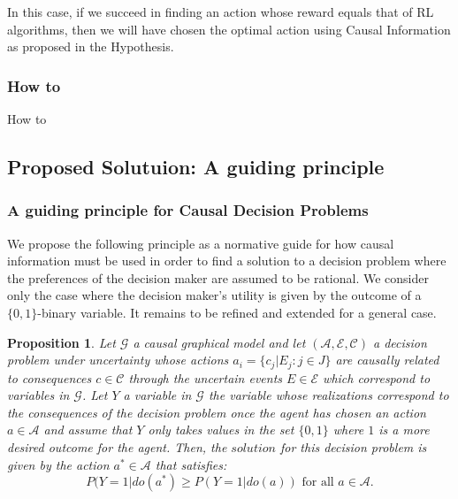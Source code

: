 \documentclass{beamer}
\theoremstyle{plain}
\newtheorem{prop}[teo]{Proposition}
\begin{document}
\begin{frame}
In this case, if we succeed in finding an action whose reward equals that of RL algorithms, then we will have chosen the optimal action using Causal Information as proposed in the Hypothesis.
\end{frame}

\begin{frame}
\frametitle{How to}
How to
\end{frame}

\subsection{Proposed Solutuion: A guiding principle}
\begin{frame}
\frametitle{A guiding principle for Causal Decision Problems}
We propose the following principle as a normative guide for how causal information must be used in order to find a solution to a decision problem where the preferences of the decision maker are assumed to be rational. We consider only the case where the decision maker's utility is given by the outcome of a $\{0,1 \}$-binary variable. It remains to be refined and extended for a general case. 
\end{frame}

\begin{frame}
\begin{prop}
Let  $\mathcal{G}$ a causal graphical model and let $(\mathcal{A},\mathcal{E},\mathcal{C})$ a decision problem under uncertainty whose actions $a_i = \{ c_j | E_j : j \in J \}$  are causally related to consequences $c \in \mathcal{C}$ through the uncertain events $E \in \mathcal{E}$ which correspond to variables in $\mathcal{G}$. Let $Y$ a variable in $\mathcal{G}$ the variable whose realizations correspond to the consequences of the decision problem once the agent has chosen an action $a \in \mathcal{A}$ and assume that $Y$ only takes values in the set $\{ 0,1\}$ where $1$ is a more desired outcome for the agent. Then, the $\textit{solution}$ for this decision problem is given by the action $a^\ast \in \mathcal{A}$ that satisfies:
\[ P(Y=1 | do(a^\ast) \geq P(Y=1 | do(a)) \textrm{ for all } a \in \mathcal{A}. \]
\end{prop}
\end{frame}
\end{document}

